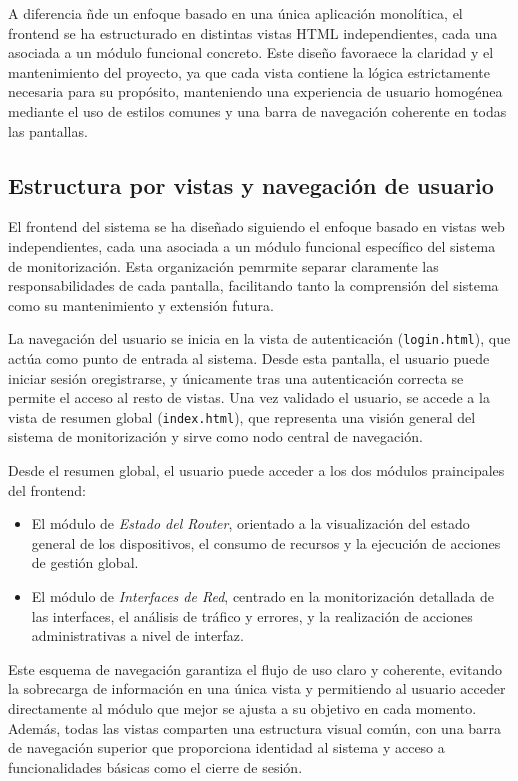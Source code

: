 A diferencia ñde un enfoque basado en una única aplicación monolítica, el frontend se ha estructurado en distintas vistas HTML independientes, cada una asociada a un módulo funcional concreto. Este diseño favoraece la claridad y el mantenimiento del proyecto, ya que cada vista contiene la lógica estrictamente necesaria para su propósito, manteniendo una experiencia de usuario homogénea mediante el uso de estilos comunes y una barra de navegación coherente en todas las pantallas.

\subsection*{Estructura por vistas  y navegación de usuario}

El frontend del sistema se ha diseñado siguiendo el enfoque basado en vistas web independientes, cada una asociada a un módulo funcional específico del sistema de monitorización. Esta organización pemrmite separar claramente las responsabilidades de cada pantalla, facilitando tanto la comprensión del sistema como su mantenimiento y extensión futura.

La navegación del usuario se inicia en la vista de autenticación (\texttt{login.html}), que actúa como punto de entrada al sistema. Desde esta pantalla, el usuario puede iniciar sesión oregistrarse, y únicamente tras una autenticación correcta se permite el acceso al resto de vistas. Una vez validado el usuario, se accede a la vista de resumen global (\texttt{index.html}), que representa una visión general del sistema de monitorización y sirve como nodo central de navegación.

Desde el resumen global, el usuario puede acceder a los dos módulos praincipales del frontend:

\begin{itemize}
    \item El módulo de \textit{Estado del Router},
    orientado a la visualización del estado general de los dispositivos, el consumo de
    recursos y la ejecución de acciones de gestión global.
    \item El módulo de \textit{Interfaces de Red},
    centrado en la monitorización detallada de las interfaces, el análisis de tráfico y
    errores, y la realización de acciones administrativas a nivel de interfaz.
\end{itemize}

Este esquema de navegación garantiza el flujo de uso claro y coherente, evitando la sobrecarga de información en una única vista y permitiendo al usuario acceder directamente al módulo que mejor se ajusta a su objetivo en cada momento. Además, todas las vistas comparten una estructura visual común, con una barra de navegación superior que proporciona identidad al sistema y acceso a funcionalidades básicas como el cierre de sesión.

